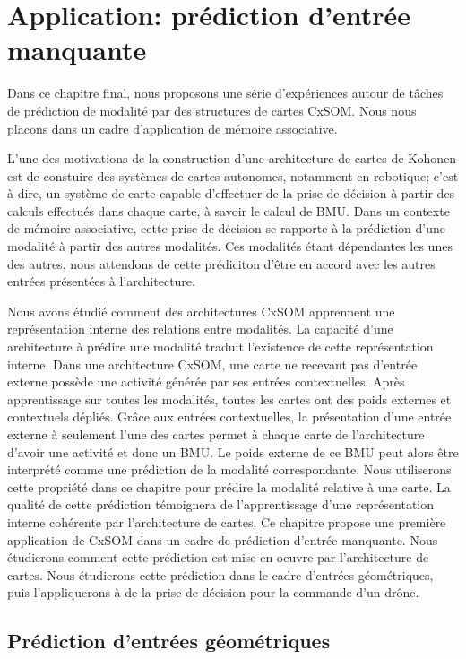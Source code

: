 \chapter{Application: prédiction d'entrée manquante}
\graphicspath{{08-Application/}}
\minitoc

Dans ce chapitre final, nous proposons une série d'expériences autour de tâches de prédiction de modalité par des structures de cartes CxSOM.
Nous nous placons dans un cadre d'application de mémoire associative.

L'une des motivations de la construction d'une architecture de cartes de Kohonen est de constuire des systèmes de cartes autonomes, notamment en robotique; c'est à dire, un système de carte capable d'effectuer de la prise de décision à partir des calculs effectués dans chaque carte, à savoir le calcul de BMU.
Dans un contexte de mémoire associative, cette prise de décision se rapporte à la prédiction d'une modalité à partir des autres modalités. Ces modalités étant dépendantes les unes des autres, nous attendons de cette prédiciton d'être en accord avec les autres entrées présentées à l'architecture.

Nous avons étudié comment des architectures CxSOM apprennent une représentation interne des relations entre modalités.
La capacité d'une architecture à prédire une modalité traduit l'existence de cette représentation interne.
Dans une architecture CxSOM, une carte ne recevant pas d'entrée externe possède une activité générée par ses entrées contextuelles.
Après apprentissage sur toutes les modalités, toutes les cartes ont des poids externes et contextuels dépliés.
Grâce aux entrées contextuelles, la présentation d'une entrée externe à seulement l'une des cartes permet à chaque carte de l'architecture d'avoir une activité et donc un BMU. Le poids externe de ce BMU peut alors être interprété comme une prédiction de la modalité correspondante.
Nous utiliserons cette propriété dans ce chapitre pour prédire la modalité relative à une carte. La qualité de cette prédiction témoignera de l'apprentissage d'une représentation interne cohérente par l'architecture de cartes. 
Ce chapitre propose une première application de CxSOM dans un cadre de prédiction d'entrée manquante. Nous étudierons comment cette prédiction est mise en oeuvre par l'architecture de cartes. Nous étudierons cette prédiction dans le cadre d'entrées géométriques, puis l'appliquerons à de la prise de décision pour la commande d'un drône.

\section{Prédiction d'entrées géométriques}

